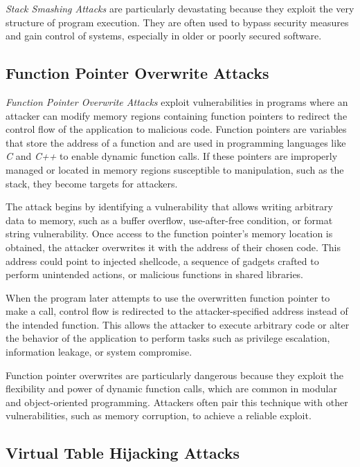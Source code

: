 \textit{Stack Smashing Attacks} are particularly devastating because they exploit
the very structure of program execution. They are often used to bypass security
measures and gain control of systems, especially in older or poorly secured software.

\subsection{Function Pointer Overwrite Attacks}
\label{subsec:background_pointeroverwrite}

\textit{Function Pointer Overwrite Attacks} exploit vulnerabilities in programs where
an attacker can modify memory regions containing function pointers to redirect the
control flow of the application to malicious code. Function pointers are
variables that store the address of a function and are used in programming
languages like \textit{C} and \textit{C++} to enable dynamic function calls. If these
pointers are improperly managed or located in memory regions susceptible to manipulation,
such as the stack, they become targets for attackers.

The attack begins by identifying a vulnerability that allows writing arbitrary data
to memory, such as a buffer overflow, use-after-free condition, or format string
vulnerability. Once access to the function pointer's memory location is obtained,
the attacker overwrites it with the address of their chosen code. This address could
point to injected shellcode, a sequence of gadgets crafted to perform unintended
actions, or malicious functions in shared libraries.

When the program later attempts to use the overwritten function pointer to make a
call, control flow is redirected to the attacker-specified address instead of
the intended function. This allows the attacker to execute arbitrary code or alter
the behavior of the application to perform tasks such as privilege escalation,
information leakage, or system compromise.

Function pointer overwrites are particularly dangerous because they exploit the flexibility
and power of dynamic function calls, which are common in modular and object-oriented
programming. Attackers often pair this technique with other vulnerabilities,
such as memory corruption, to achieve a reliable exploit.

\subsection{Virtual Table Hijacking Attacks}
\label{subsec:background_virtualtable}

